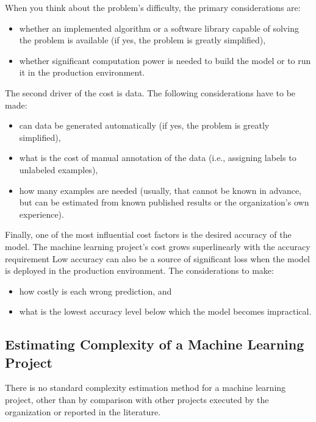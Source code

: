 When you think about the problem's difficulty, the primary considerations are:
\begin{itemize}
    \item whether an implemented algorithm or a software library capable of
    solving the problem is available (if yes, the problem is greatly simplified),

    \item whether significant computation power is needed to build the model or
    to run it in the production environment.
\end{itemize}

The second driver of the cost is data. The following considerations have to be made:
\begin{itemize}
    \item can data be generated automatically (if yes, the problem is greatly simplified),
    \item what is the cost of manual annotation of the data (i.e., assigning labels to unlabeled
    examples),
    \item how many examples are needed (usually, that cannot be known in advance, but can be
    estimated from known published results or the organization's own experience).
\end{itemize}

Finally, one of the most influential cost factors is the desired accuracy of the model. The
machine learning project's cost grows superlinearly with the accuracy requirement
Low accuracy can also be a source of significant loss when the model is
deployed in the production environment. The considerations to make:
\begin{itemize}
    \item how costly is each wrong prediction, and
    \item what is the lowest accuracy level below which the model becomes impractical.
\end{itemize}





\subsection{Estimating Complexity of a Machine Learning Project}
There is no standard complexity estimation method for a machine learning project, other than
by comparison with other projects executed by the organization or reported in the literature.



